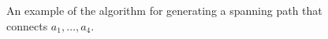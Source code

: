 \documentclass[11pt]{patmorin}
\begin{document}
\begin{figure}
   \caption{An example of the algorithm for generating a spanning path that connects $a_1,\ldots,a_4$.}
   \label{figure:big-example}
\end{figure}
\end{document}
